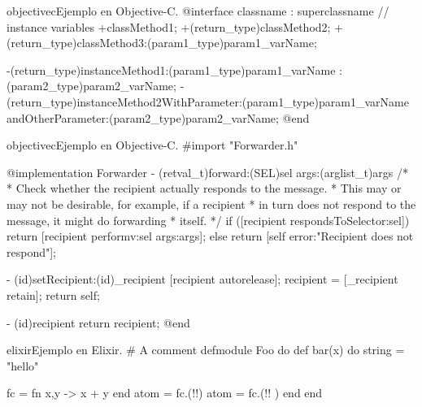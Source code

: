 \begin{sourcecode}{objectivec}{Ejemplo en Objective-C.}
@interface classname : superclassname {
    // instance variables
}
+classMethod1;
+(return_type)classMethod2;
+(return_type)classMethod3:(param1_type)param1_varName;

-(return_type)instanceMethod1:(param1_type)param1_varName :(param2_type)param2_varName;
-(return_type)instanceMethod2WithParameter:(param1_type)param1_varName andOtherParameter:(param2_type)param2_varName;
@end
\end{sourcecode}

\begin{sourcecode}{objectivec}{Ejemplo en Objective-C.}
#import "Forwarder.h"

@implementation Forwarder
- (retval_t)forward:(SEL)sel args:(arglist_t)args {
  /*
  * Check whether the recipient actually responds to the message.
  * This may or may not be desirable, for example, if a recipient
  * in turn does not respond to the message, it might do forwarding
  * itself.
  */
  if ([recipient respondsToSelector:sel]) {
    return [recipient performv:sel args:args];
  } else {
    return [self error:"Recipient does not respond"];
  }
}

- (id)setRecipient:(id)_recipient {
  [recipient autorelease];
  recipient = [_recipient retain];
  return self;
}

- (id)recipient {
  return recipient;
}
@end
\end{sourcecode}

\begin{sourcecode}{elixir}{Ejemplo en Elixir.}
# A comment
defmodule Foo do
	def bar(x) do
		string = "hello"

		fc = fn x,y -> x + y end 
		atom = fc.(!!)
		atom = fc.(!! )
	end
end
\end{sourcecode}

